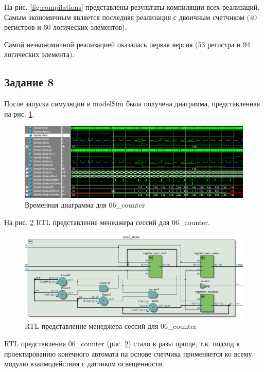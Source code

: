 \documentclass[a4paper,14pt]{article}
\begin{document}
	На рис. \ref{fig:compilations} представлены результаты компиляции всех реализаций. Самым экономичным является  последняя реализация с двоичным счетчиком (40 регистров и 60 логических элементов).
	
	Самой неэкономичной реализацией оказалась первая версия (53 регистра и 94 логических элемента).  
	
	
	\subsection{Задание 8}
	
	После запуска симуляции в modelSim была получена диаграмма, представленная на рис. \ref{fig:z8msimwvf}.
	
	\begin{figure}[H]
		\centering
		\includegraphics[width=0.9\linewidth]{images/z9}
		\caption{Временная диаграмма для 06\_counter}
		\label{fig:z8msimwvf}
	\end{figure}
	
	На рис. \ref{fig:z8rtl} RTL представление менеджера сессий для 06\_counter.
	
	\begin{figure}[H]
		\centering
		\includegraphics[width=0.9\linewidth]{images/z8_rtl}
		\caption{RTL представление менеджера сессий для 06\_counter}
		\label{fig:z8rtl}
	\end{figure}
		
	RTL представления 06\_counter (рис. \ref{fig:z8rtl}) стало в разы проще, т.к. подход к проектированию конечного автомата на основе счетчика	применяется ко всему модулю взаимодействия с датчиком освещенности.
	
\end{document}
